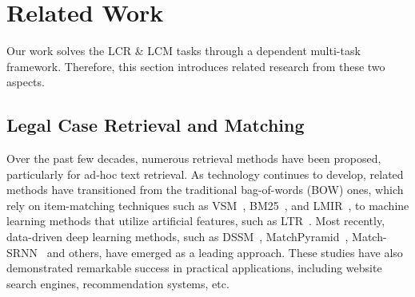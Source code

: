 \section{Related Work} \label{sec:related_work}
Our work solves the LCR \& LCM tasks through a dependent multi-task framework.
Therefore, this section introduces related research from these two aspects.



\subsection{Legal Case Retrieval and Matching}
Over the past few decades, numerous retrieval methods have been proposed, particularly for ad-hoc text retrieval.
As technology continues to develop, related methods have transitioned from the traditional bag-of-words (BOW) ones, which rely on item-matching techniques such as VSM~\cite{salton1988VSM}, BM25~\cite{robertson1994BM25}, and LMIR~\cite{song1999LMIR}, to machine learning methods that utilize artificial features, such as LTR~\cite{liu2009LTR}.
Most recently, data-driven deep learning methods, such as DSSM~\cite{hu2014DSSM}, MatchPyramid~\cite{pang2016MatchPyramid}, Match-SRNN~\cite{wan2016Match-SRNN} and others, have emerged as a leading approach.
These studies have also demonstrated remarkable success in practical applications, including website search engines, recommendation systems, etc.

